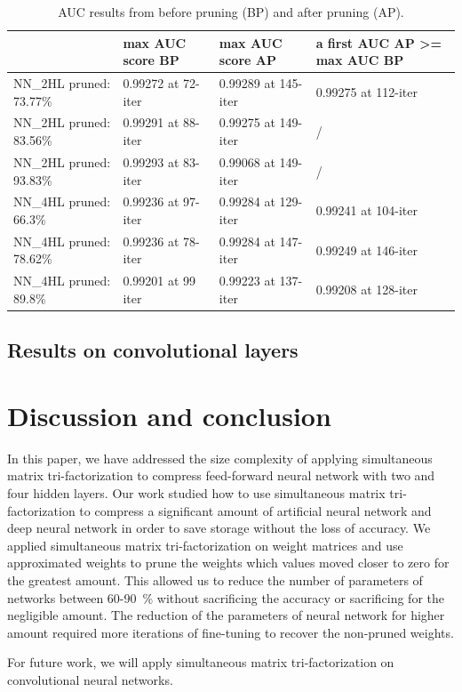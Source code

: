 \documentclass{article} %
\begin{document}
\begin{table}[!ht]
\centering
\begin{tabular}{l|l|l|p{3cm}|}
\cline{2-4}
 & max AUC score BP & max AUC score AP & a first AUC AP \textgreater= max AUC BP 
\\ \hline
\multicolumn{1}{|l|}{NN\_2HL pruned: 73.77\%} & 0.99272 at 72-iter & 0.99289 at 
145-iter & 0.99275 at 112-iter \\ \hline
\multicolumn{1}{|l|}{NN\_2HL pruned: 83.56\%} & 0.99291 at 88-iter & 0.99275 at 
149-iter & / \\ \hline
\multicolumn{1}{|l|}{NN\_2HL pruned: 93.83\%} & 0.99293 at 83-iter & 0.99068 at 
149-iter & / \\ \hline
\multicolumn{1}{|l|}{NN\_4HL pruned: 66.3\%} & 0.99236 at 97-iter & 0.99284 at 
129-iter & 0.99241 at 104-iter \\ \hline
\multicolumn{1}{|l|}{NN\_4HL pruned: 78.62\%} & 0.99236 at 78-iter & 0.99284 at 
147-iter & 0.99249 at 146-iter \\ \hline
\multicolumn{1}{|l|}{NN\_4HL pruned: 89.8\%} & 0.99201 at 99 iter & 0.99223 at 
137-iter & 0.99208 at 128-iter \\ \hline
\end{tabular}
\caption{AUC results from before pruning (BP) and after pruning (AP).}
\label{t:results}
\end{table}

\subsection{Results on convolutional layers}

\newpage 
\section{Discussion and conclusion}
In this paper, we have addressed the size complexity of applying simultaneous 
matrix tri-factorization to compress feed-forward neural network with two and 
four hidden layers. Our work studied how to use simultaneous matrix 
tri-factorization to compress a significant amount of artificial neural network 
and deep neural network in order to save storage without the loss of accuracy. 
We applied simultaneous matrix tri-factorization on weight matrices and use 
approximated weights to prune the weights which values moved closer to zero for 
the greatest amount. This allowed us to reduce the number of parameters of 
networks between 60-90~\% without sacrificing the accuracy or sacrificing for 
the negligible amount. The reduction of the parameters of neural network for 
higher amount required more iterations of fine-tuning to recover the non-pruned 
weights. 

For future work, we will apply simultaneous matrix tri-factorization on 
convolutional neural networks.





\todos
\end{document}
